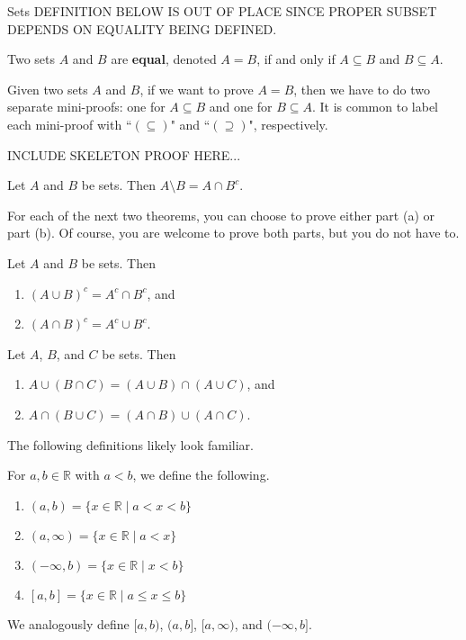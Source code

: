 \begin{section}{Sets}
DEFINITION BELOW IS OUT OF PLACE SINCE PROPER SUBSET DEPENDS ON EQUALITY BEING DEFINED.

\begin{definition}
Two sets $A$ and $B$ are \textbf{equal}, denoted $\boxed{A=B}$, if and only if $A \subseteq B$ and $B \subseteq A$.
\end{definition}

Given two sets $A$ and $B$, if we want to prove $A=B$, then we have to do two separate mini-proofs: one for $A\subseteq B$ and one for $B\subseteq A$. It is common to label each mini-proof with ``$(\subseteq)$" and ``$(\supseteq)$", respectively.

INCLUDE SKELETON PROOF HERE...

\begin{theorem}
Let $A$ and $B$ be sets.  Then $A\setminus B = A \cap B^c$.
\end{theorem}

For each of the next two theorems, you can choose to prove either part (a) or part (b). Of course, you are welcome to prove both parts, but you do not have to.

\begin{theorem}
Let $A$ and $B$ be sets. Then
\begin{enumerate}[label=\textrm{(\alph*)}]
\item $(A \cup B)^c = A^c \cap B^c$, and
\item $(A \cap B)^c = A^c \cup B^c$.
\end{enumerate}
\end{theorem}

\begin{theorem}
Let $A$, $B$, and $C$ be sets. Then
\begin{enumerate}[label=\textrm{(\alph*)}]
\item $A \cup(B\cap C) = (A\cup B)\cap (A\cup C)$, and
\item $A\cap (B\cup C)= (A\cap B)\cup (A\cap C)$.
\end{enumerate}
\end{theorem}

The following definitions likely look familiar.

\begin{definition}
For $a,b\in\mathbb{R}$ with $a<b$, we define the following.
\begin{multicols}{2}
\begin{enumerate}[label=\textrm{(\alph*)}]
\item $(a,b)=\{x\in\mathbb{R}\mid a<x<b\}$
\item $(a,\infty)=\{x\in\mathbb{R}\mid a<x\}$
\item $(-\infty,b)=\{x\in\mathbb{R}\mid x<b\}$
\item $[a,b]=\{x\in\mathbb{R}\mid a\leq x\leq b\}$
\end{enumerate}
\end{multicols}
\noindent We analogously define $[a,b)$, $(a,b]$, $[a,\infty)$, and $(-\infty,b]$.
\end{definition}


\end{section}
